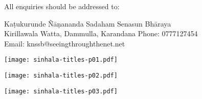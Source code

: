 \vspace*{2\baselineskip}

{\centering

All enquiries should be addressed to:

Kaṭukurunde Ñāṇananda Sadaham Senasun Bhāraya \\
Kirillawala Watta, Dammulla, Karandana
Phone: 0777127454 \\
Email: knssb@seeingthroughthenet.net

\par}

\clearpage

\texttt{[image: sinhala-titles-p01.pdf]}

\texttt{[image: sinhala-titles-p02.pdf]}

\texttt{[image: sinhala-titles-p03.pdf]}
